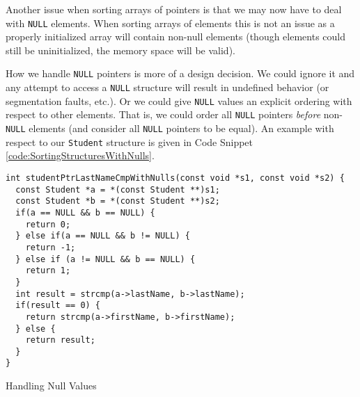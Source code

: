 Another issue when sorting arrays of pointers is that we may now 
have to deal with \texttt{NULL} elements.  When sorting 
arrays of elements this is not an issue as a properly initialized 
array will contain non-null elements (though elements could still
be uninitialized, the memory space will be valid).

How we handle \texttt{NULL} pointers is more of a design 
decision.  We could ignore it and any attempt to access a 
\texttt{NULL} structure will result in undefined
behavior (or segmentation faults, etc.).  Or we could give 
\texttt{NULL} values an explicit ordering with respect to 
other elements.  That is, we could order all \texttt{NULL}
pointers \emph{before} non-\texttt{NULL} elements (and consider 
all \texttt{NULL} pointers to be equal).  An example with respect 
to our \texttt{Student} structure is given in Code Snippet 
\ref{code:SortingStructuresWithNulls}.

\begin{listing}[H]
\begin{verbatim}
int studentPtrLastNameCmpWithNulls(const void *s1, const void *s2) {
  const Student *a = *(const Student **)s1;
  const Student *b = *(const Student **)s2;
  if(a == NULL && b == NULL) {
    return 0;
  } else if(a == NULL && b != NULL) {
    return -1;
  } else if (a != NULL && b == NULL) {
    return 1;
  }
  int result = strcmp(a->lastName, b->lastName);
  if(result == 0) {
    return strcmp(a->firstName, b->firstName);
  } else {
    return result;
  }
}
\end{verbatim}
\caption{Handling Null Values}
\label{code:SortingStructuresWithNulls}
\end{listing}

